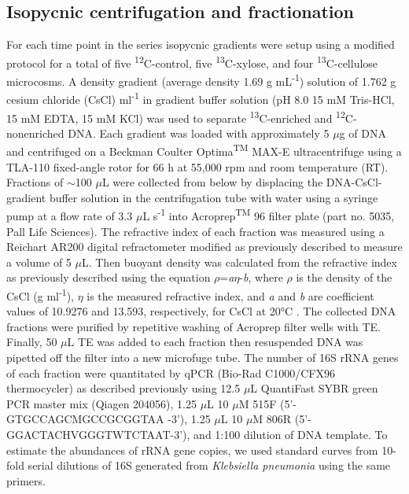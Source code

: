 \subsection{Isopycnic centrifugation and fractionation}
For each time point in the series isopycnic gradients were setup using
a modified protocol \cite{Neufeld_2007} for a total of five
\textsuperscript{12}C-control, five \textsuperscript{13}C-xylose, and four
\textsuperscript{13}C-cellulose microcosms. A density gradient (average density
1.69 g mL\textsuperscript{-1}) solution of 1.762 g cesium chloride (CsCl)
ml\textsuperscript{-1} in gradient buffer solution (pH 8.0 15 mM Tris-HCl, 15
mM EDTA, 15 mM KCl) was used to separate \textsuperscript{13}C-enriched and
\textsuperscript{12}C-nonenriched DNA. Each gradient was loaded with
approximately 5 $\mu$g of DNA and centrifuged on a Beckman Coulter
Optima\textsuperscript{TM} MAX-E ultracentrifuge using a TLA-110 fixed-angle
rotor for 66 h at 55,000 rpm and room temperature (RT). Fractions of $\sim$100
$\mu$L were collected from below by displacing the DNA-CsCl-gradient buffer
solution in the centrifugation tube with water using a syringe pump at a flow
rate of 3.3 $\mu$L s\textsuperscript{-1} \cite{Manefield_2002} into
Acroprep\textsuperscript{TM} 96 filter plate (part no. 5035, Pall Life
Sciences). The refractive index of each fraction was measured using a Reichart
AR200 digital refractometer modified as previously described
\cite{Buckley_2007} to measure a volume of 5 $\mu$L. Then buoyant density was
calculated from the refractive index as previously described
\cite{Buckley_2007} using the equation $\rho$=\textit{a}$\eta$-\textit{b},
where $\rho$ is the density of the CsCl (g ml\textsuperscript{-1}), $\eta$ is
the measured refractive index, and \textit{a} and \textit{b} are coefficient
values of 10.9276 and 13.593, respectively, for CsCl at 20°C
\cite{9780408708036}. The collected DNA fractions were purified by repetitive
washing of Acroprep filter wells with TE. Finally, 50 $\mu$L TE was added to
each fraction then resuspended DNA was pipetted off the filter into a new
microfuge tube. The number of 16S rRNA genes of each fraction were quantitated
by qPCR (Bio-Rad C1000/CFX96 thermocycler) as described previously
\cite{Berthrong_2013} using 12.5 $\mu$L QuantiFast SYBR green PCR  master mix
(Qiagen 204056), 1.25 $\mu$L 10 $\mu$M 515F (5'-GTGCCAGCMGCCGCGGTAA -3'), 1.25
$\mu$L 10 $\mu$M 806R (5'-GGACTACHVGGGTWTCTAAT-3'), and 1:100 dilution of DNA
template. To estimate the abundances of rRNA gene copies, we used standard
curves from 10-fold serial dilutions of 16S generated from \textit{Klebsiella
pneumonia} using the same primers.   

